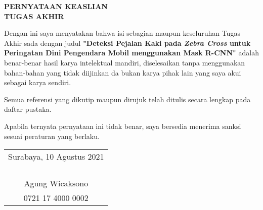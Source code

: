 \begin{center}
  \large
  \textbf{PERNYATAAN KEASLIAN\\TUGAS AKHIR}
\end{center}

\thispagestyle{empty}

\vspace{2ex}


Dengan ini saya menyatakan bahwa isi sebagian maupun keseluruhan Tugas Akhir sada dengan judul \textbf{"Deteksi Pejalan Kaki pada \textit{Zebra Cross} untuk Peringatan Dini Pengendara Mobil menggunakan Mask R-CNN"} adalah benar-benar hasil karya intelektual mandiri, diselesaikan tanpa menggunakan bahan-bahan yang tidak diijinkan da bukan karya pihak lain yang saya akui sebagai karya sendiri.

Semua referensi yang dikutip maupun dirujuk telah ditulis secara lengkap pada daftar pustaka.

Apabila ternyata pernyataan ini tidak benar, saya bersedia menerima sanksi sesuai peraturan yang berlaku.

\vspace{4ex}

\begin{flushright}
  \begin{tabular}[b]{c}
    Surabaya, 10 Agustus 2021\\
    \\
    \\
    \\
    \\
    Agung Wicaksono\\
    0721 17 4000 0002
  \end{tabular}
\end{flushright}
